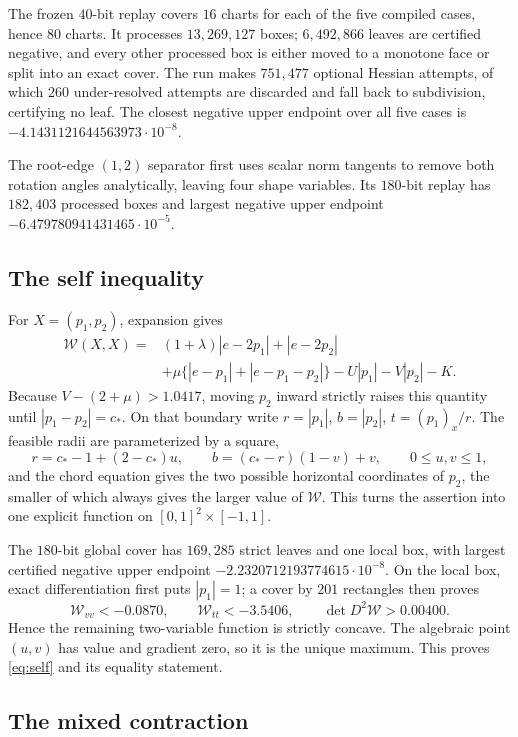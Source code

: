 \documentclass[11pt]{article}
\theoremstyle{plain}
\theoremstyle{definition}
\theoremstyle{remark}
\newcommand{\cstar}{c_{\!*}}
\newcommand{\W}{\mathcal W}
\begin{document}
The frozen $40$-bit replay covers $16$ charts for each of the five compiled
cases, hence $80$ charts.  It processes $13{,}269{,}127$ boxes;
$6{,}492{,}866$ leaves are certified negative, and every other processed
box is either moved to a monotone face or split into an exact cover.  The
run makes $751{,}477$ optional Hessian attempts, of which $260$
under-resolved attempts are discarded and fall back to subdivision,
certifying no leaf.  The closest negative upper endpoint over all five
cases is $-4.1431121644563973\cdot10^{-8}$.

The root-edge $(1,2)$ separator first uses scalar norm tangents to remove
both rotation angles analytically, leaving four shape variables.  Its
$180$-bit replay has $182{,}403$ processed boxes and largest negative upper
endpoint $-6.479780941431465\cdot10^{-5}$.

\subsection{The self inequality}

For $X=(p_1,p_2)$, expansion gives
\begin{align*}
 \W(X,X)={}&(1+\lambda)|e-2p_1|+|e-2p_2|\\
 &+\mu\bigl\{|e-p_1|+|e-p_1-p_2|\bigr\}-U|p_1|-V|p_2|-K .
\end{align*}
Because $V-(2+\mu)>1.0417$, moving $p_2$ inward strictly raises this
quantity until $|p_1-p_2|=\cstar$.  On that boundary write
$r=|p_1|$, $b=|p_2|$, $t=(p_1)_x/r$.  The feasible radii are parameterized
by a square,
\[
 r=\cstar-1+(2-\cstar)u,\qquad b=(\cstar-r)(1-v)+v,\qquad 0\le u,v\le1,
\]
and the chord equation gives the two possible horizontal coordinates of
$p_2$, the smaller of which always gives the larger value of $\W$.  This
turns the assertion into one explicit function on $[0,1]^2\times[-1,1]$.

The $180$-bit global cover has $169{,}285$ strict leaves and one local box,
with largest certified negative upper endpoint
$-2.2320712193774615\cdot10^{-8}$.  On the local box, exact
differentiation first puts $|p_1|=1$; a cover by $201$ rectangles then
proves
\[
 \W_{vv}<-0.0870,\qquad \W_{tt}<-3.5406,\qquad \det D^2\W>0.00400 .
\]
Hence the remaining two-variable function is strictly concave.  The
algebraic point $(u,v)$ has value and gradient zero, so it is the unique
maximum.  This proves \eqref{eq:self} and its equality statement.

\subsection{The mixed contraction}
\end{document}
